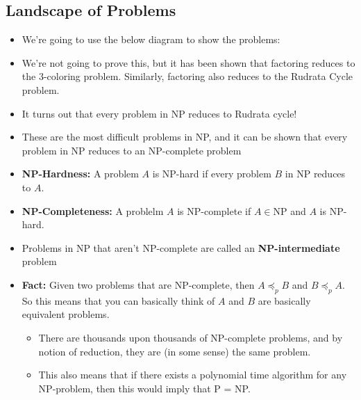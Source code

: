 \subsection{Landscape of Problems}
\begin{itemize}
	\item We're going to use the below diagram to show the problems:
		\begin{center}
		\end{center}
	\item We're not going to prove this, but it has been shown that factoring reduces to the 3-coloring 
		problem. Similarly, factoring also reduces to the Rudrata Cycle problem. 
	\item It turns out that every problem in NP reduces to Rudrata cycle!
	\item These are the most difficult problems in NP, and it can be shown that every problem in NP reduces 
		to an NP-complete problem
	\item \textbf{NP-Hardness:} A problem \(A\) is NP-hard if every problem \(B\) in NP reduces to \(A\). 
	\item \textbf{NP-Completeness:} A problelm \(A\) is NP-complete if \(A \in \text{NP}\) and \(A\) is 
		NP-hard.
	\item Problems in NP that aren't NP-complete are called an \textbf{NP-intermediate} problem 
	\item \textbf{Fact:} Given two problems that are NP-complete, then \(A \preceq_p B\) and \(B \preceq_p A\). 
		So this means that you can basically think of \(A\) and \(B\) are basically equivalent problems. 


		\begin{itemize}
			\item  There are thousands upon thousands of NP-complete problems, and by notion of reduction, 
				they are (in some sense) the same problem.
			\item This also means that if there exists a polynomial time algorithm for any NP-problem, 
				then this would imply that P = NP.
		\end{itemize}
\end{itemize}

